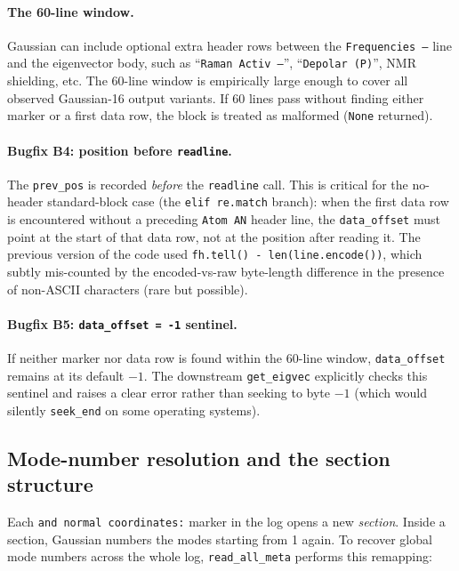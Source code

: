 \documentclass[10pt,a4paper,twoside]{article}
\newcommand{\fn}[1]{\texttt{#1}}
\begin{document}
\paragraph{The 60-line window.} Gaussian can include optional
extra header rows between the \texttt{Frequencies ---} line and the
eigenvector body, such as ``\texttt{Raman Activ --}'',
``\texttt{Depolar (P)}'', NMR shielding, etc. The 60-line window
is empirically large enough to cover all observed Gaussian-16
output variants. If 60 lines pass without finding either marker
or a first data row, the block is treated as malformed (\fn{None}
returned).

\paragraph{Bugfix B4: position before \texttt{readline}.} The
\texttt{prev\_pos} is recorded \emph{before} the \texttt{readline}
call. This is critical for the no-header standard-block case
(the \texttt{elif re.match} branch): when the first data row is
encountered without a preceding \texttt{Atom AN} header line, the
\texttt{data\_offset} must point at the start of that data row, not
at the position after reading it. The previous version of the
code used \texttt{fh.tell() - len(line.encode())}, which subtly
mis-counted by the encoded-vs-raw byte-length difference in the
presence of non-ASCII characters (rare but possible).

\paragraph{Bugfix B5: \texttt{data\_offset = -1} sentinel.} If
neither marker nor data row is found within the 60-line window,
\texttt{data\_offset} remains at its default $-1$. The downstream
\fn{get\_eigvec} explicitly checks this sentinel and raises a
clear error rather than seeking to byte $-1$ (which would silently
\texttt{seek\_end} on some operating systems).

\subsection{Mode-number resolution and the section structure}

Each \texttt{and normal coordinates:} marker in the log opens a new
\emph{section}. Inside a section, Gaussian numbers the modes
starting from 1 again. To recover global mode numbers across the
whole log, \fn{read\_all\_meta} performs this remapping:
\end{document}
